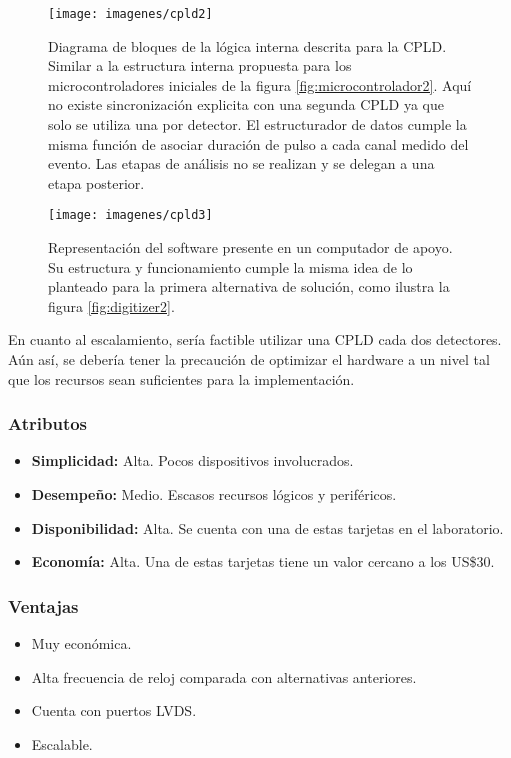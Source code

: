 \begin{figure}[H]
	\centering
	\texttt{[image: imagenes/cpld2]}
	\caption{Diagrama de bloques de la lógica interna descrita para la CPLD. Similar a la estructura interna propuesta para los microcontroladores iniciales de la figura \ref{fig:microcontrolador2}. Aquí no existe sincronización explicita con una segunda CPLD ya que solo se utiliza una por detector. El estructurador de datos cumple la misma función de asociar duración de pulso a cada canal medido del evento. Las etapas de análisis no se realizan y se delegan a una etapa posterior.}
	\label{fig:cpld2}
\end{figure}

\newpage
\begin{figure}[H]
	\centering
	\texttt{[image: imagenes/cpld3]}
	\caption{Representación del software presente en un computador de apoyo. Su estructura y funcionamiento cumple la misma idea de lo planteado para la primera alternativa de solución, como ilustra la figura \ref{fig:digitizer2}.}
	\label{fig:cpld3}
\end{figure}


\par En cuanto al escalamiento, sería factible utilizar una CPLD cada dos detectores. Aún así, se debería tener la precaución de optimizar el hardware a un nivel tal que los recursos sean suficientes para la implementación.

\subsubsection*{Atributos}
\begin{itemize}
	\item \textbf{Simplicidad:  } Alta. Pocos dispositivos involucrados.
	\item \textbf{Desempeño:}  Medio. Escasos recursos lógicos y periféricos.
	\item \textbf{Disponibilidad:}  Alta. Se cuenta con una de estas tarjetas en el laboratorio.
	\item \textbf{Economía: } Alta. Una de estas tarjetas tiene un valor cercano a los US\$30.
\end{itemize}

\subsubsection*{Ventajas}
\begin{itemize}
	\item Muy económica.
	\item Alta frecuencia de reloj comparada con alternativas anteriores.
	\item Cuenta con puertos LVDS.
	\item Escalable.
\end{itemize}


